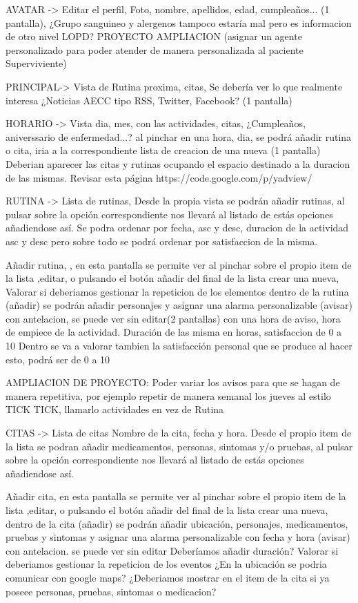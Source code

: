 \documentclass[../pfc.tex]{subfiles}
\begin{document}
	AVATAR -> 		Editar el perfil, Foto, nombre, apellidos, edad, cumpleaños... (1 pantalla), ¿Grupo sanguineo y alergenos tampoco estaría mal pero es informacion de otro nivel LOPD?
	PROYECTO AMPLIACION (asignar un agente personalizado para poder atender de manera personalizada al paciente Superviviente)
	
	PRINCIPAL-> 	Vista de Rutina proxima, citas, Se debería ver lo que realmente interesa ¿Noticias AECC tipo RSS, Twitter, Facebook? (1 pantalla)
	
	HORARIO -> 		Vista dia, mes, con las actividades, citas, ¿Cumpleaños, aniverssario de enfermedad...?  
	al pinchar en una hora, dia, se podrá añadir rutina o cita, iria a la correspondiente lista de creacion de una nueva (1 pantalla)
	Deberian aparecer las citas y rutinas ocupando el espacio destinado a la duracion de las mismas.
	Revisar esta página
	https://code.google.com/p/yadview/
	
	RUTINA -> 		Lista de rutinas,
	Desde la propia vista se podrán añadir rutinas, al pulsar sobre la opción correspondiente nos llevará al listado de estás opciones añadiendose así.
	Se podra ordenar por fecha, asc y desc, duracion de la actividad asc y desc pero sobre todo se podrá ordenar por satisfaccion de la misma.
	
	
	Añadir rutina, , en esta pantalla se permite ver al pinchar sobre el propio item de la lista ,editar, o pulsando el botón añadir del final de la lista crear una nueva,
	Valorar si deberiamos gestionar la repeticion de los elementos					
	dentro de la rutina (añadir) se podrán añadir personajes y asignar una alarma personalizable (avisar) con antelacion, se puede ver sin editar(2 pantallas)
	con una hora de aviso, hora de empiece de la actividad. Duración de las misma en horas, satisfaccion de 0 a 10
	Dentro se va a valorar tambien la satisfacción personal que se produce al hacer esto, podrá ser de 0 a 10
	
	AMPLIACION DE PROYECTO: Poder variar los avisos para que se hagan de manera repetitiva, por ejemplo repetir de manera semanal los jueves al estilo TICK TICK, llamarlo actividades en vez de Rutina 
	
	CITAS -> 		Lista de citas Nombre de la cita, fecha y hora.
	Desde el propio item de la lista se podran añadir medicamentos, personas, sintomas y/o pruebas, al pulsar sobre la opción correspondiente nos llevará al listado de estás opciones añadiendose así.
	
	Añadir cita, en esta pantalla se permite ver al pinchar sobre el propio item de la lista ,editar, o pulsando el botón añadir del final de la lista crear una nueva, 
	dentro de la cita (añadir) se podrán añadir ubicación, personajes, medicamentos, pruebas y sintomas y asignar una alarma personalizable con fecha y hora (avisar) con antelacion.
	se puede ver sin editar
	Deberíamos añadir duración?
	Valorar si deberiamos gestionar la repeticion de los eventos
	¿En la ubicación se podria comunicar con google maps?
	¿Deberiamos mostrar en el item de la cita si ya poseee personas, pruebas, sintomas o medicacion?
	
\end{document}
